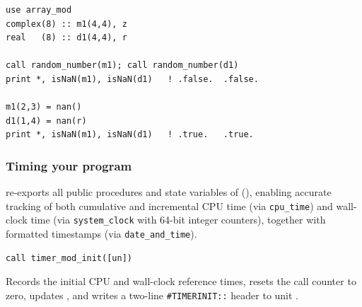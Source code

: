 \lstset{language=[95]Fortran}
\begin{lstlisting}
use array_mod
complex(8) :: m1(4,4), z
real   (8) :: d1(4,4), r

call random_number(m1); call random_number(d1)
print *, isNaN(m1), isNaN(d1)   ! .false.  .false.

m1(2,3) = nan()
d1(1,4) = nan(r)
print *, isNaN(m1), isNaN(d1)   ! .true.   .true.
\end{lstlisting}

\subsubsection{Timing your program}
\label{subsubsec:timing_program}

 re-exports all public procedures and state variables of  (), enabling accurate tracking of both cumulative and incremental CPU time (via \texttt{cpu\_time}) and wall-clock time (via \texttt{system\_clock} with 64-bit integer counters), together with formatted timestamps (via \texttt{date\_and\_time}).


\lstset{language=[95]Fortran}
\begin{lstlisting}
call timer_mod_init([un])
\end{lstlisting}

Records the initial CPU and wall-clock reference times, resets the call counter  to zero, updates , and writes a two-line \texttt{\#TIMERINIT::} header to unit .

